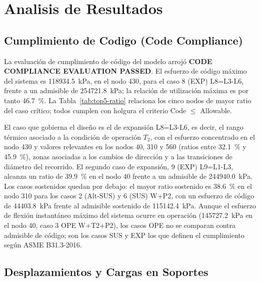 \section{Analisis de Resultados}
\label{sec:analisis}

\subsection{Cumplimiento de Codigo (Code Compliance)}

La evaluaci\'{o}n de cumplimiento de c\'{o}digo del modelo arroj\'{o}
\textbf{CODE COMPLIANCE EVALUATION PASSED}. El esfuerzo de c\'{o}digo
m\'{a}ximo del sistema es \num{118934.5}~\si{kPa}, en el nodo 430, para el
caso 8 (EXP) L8=L3-L6, frente a un admisible de \num{254721.8}~\si{kPa}; la
relaci\'{o}n de utilizaci\'{o}n m\'{a}xima es por tanto 46.7~\%. La
Tabla~\ref{tab:top5-ratio} relaciona los cinco nodos de mayor ratio del caso
cr\'{i}tico; todos cumplen con holgura el criterio Code $\leq$ Allowable.



El caso que gobierna el dise\~{n}o es el de expansi\'{o}n L8=L3-L6, es decir,
el rango t\'{e}rmico asociado a la condici\'{o}n de operaci\'{o}n $T_2$, con
el esfuerzo concentrado en el nodo 430 y valores relevantes en los nodos 40,
310 y 560 (ratios entre 32.1~\% y 45.9~\%), zonas asociadas a los cambios de
direcci\'{o}n y a las transiciones de di\'{a}metro del recorrido. El segundo
caso de expansi\'{o}n, 9 (EXP) L9=L1-L3, alcanza un ratio de 39.9~\% en el
nodo 40 frente a un admisible de \num{244940.0}~\si{kPa}. Los casos
sostenidos quedan por debajo: el mayor ratio sostenido es 38.6~\% en el nodo
310 para los casos 2 (Alt-SUS) y 6 (SUS) W+P2, con un esfuerzo de c\'{o}digo
de \num{44403.8}~\si{kPa} frente al admisible sostenido de
\num{115142.4}~\si{kPa}. Aunque el esfuerzo de flexi\'{o}n instant\'{a}neo
m\'{a}ximo del sistema ocurre en operaci\'{o}n (\num{145727.2}~\si{kPa} en el
nodo 40, caso 3 OPE W+T2+P2), los casos OPE no se comparan contra admisible
de c\'{o}digo; son los casos SUS y EXP los que definen el cumplimiento
seg\'{u}n ASME B31.3-2016.

\subsection{Desplazamientos y Cargas en Soportes}

